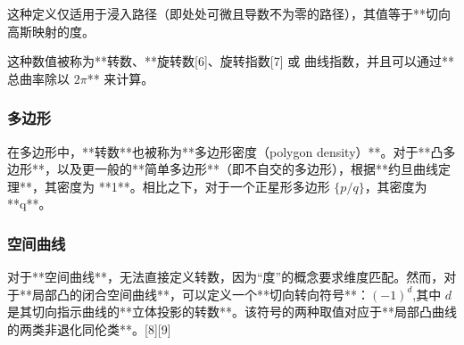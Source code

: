 这种定义仅适用于浸入路径（即处处可微且导数不为零的路径），其值等于**切向高斯映射的度。

这种数值被称为**转数、**旋转数[6]、旋转指数[7] 或 曲线指数，并且可以通过**总曲率除以 $2\pi$** 来计算。
\subsubsection{多边形}
在多边形中，**转数**也被称为**多边形密度（polygon density）**。对于**凸多边形**，以及更一般的**简单多边形**（即不自交的多边形），根据**约旦曲线定理**，其密度为 **1**。相比之下，对于一个正星形多边形 $\{p/q\}$，其密度为 **q**。
\subsubsection{空间曲线}
对于**空间曲线**，无法直接定义转数，因为“度”的概念要求维度匹配。然而，对于**局部凸的闭合空间曲线**，可以定义一个**切向转向符号**：$(-1)^d$,其中 $d$ 是其切向指示曲线的**立体投影的转数**。该符号的两种取值对应于**局部凸曲线的两类非退化同伦类**。[8][9]
